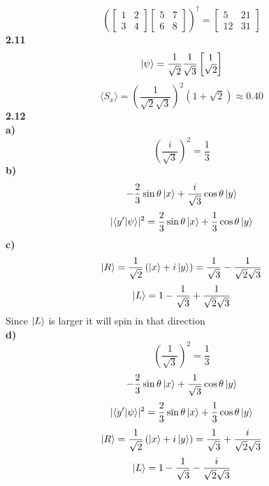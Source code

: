 \documentclass[english]{article}
\begin{document}
\begin{multicols*}{2}
\[
\left(
\begin{bmatrix}
1&2\\
3&4
\end{bmatrix}
\begin{bmatrix}
5&7\\
6&8
\end{bmatrix}
\right)^\dag
=
\begin{bmatrix}
5&21\\
12&31
\end{bmatrix}
\]
\noindent
\textbf{2.11}\\
\[
\ket{\psi}=\frac{1}{\sqrt{2}}\frac{1}{\sqrt{3}}
\begin{bmatrix}
1\\
\sqrt{2}
\end{bmatrix}
\]
$$\langle S_x\rangle=\left(\frac{1}{\sqrt{2}\sqrt{3}}\right)^2\left(1+\sqrt{2}\right)\approx0.40$$
\noindent
\textbf{2.12}\\
\textbf{a)} $$\left(\frac{i}{\sqrt{3}}\right)^2=\frac{1}{3}$$
\textbf{b)} $$-\frac{2}{3}\sin\theta\ket{x}+\frac{i}{\sqrt{3}}\cos\theta\ket{y}$$
$$\lvert\bra{y'}\ket{\psi}\rvert^2=\frac{2}{3}\sin\theta\ket{x}+\frac{1}{3}\cos\theta\ket{y}$$
\textbf{c)} $$\ket{R}=\frac{1}{\sqrt{2}}\left(\ket{x}+i\ket{y}\right)=\frac{1}{\sqrt{3}}-\frac{1}{\sqrt{2}\sqrt{3}}$$
$$\ket{L}=1-\frac{1}{\sqrt{3}}+\frac{1}{\sqrt{2}\sqrt{3}}$$
Since $\ket{L}$ is larger it will spin in that direction\\
\textbf{d)} $$\left(\frac{1}{\sqrt{3}}\right)^2=\frac{1}{3}$$
$$-\frac{2}{3}\sin\theta\ket{x}+\frac{1}{\sqrt{3}}\cos\theta\ket{y}$$
$$\lvert\bra{y'}\ket{\psi}\rvert^2=\frac{2}{3}\sin\theta\ket{x}+\frac{1}{3}\cos\theta\ket{y}$$
$$\ket{R}=\frac{1}{\sqrt{2}}\left(\ket{x}+i\ket{y}\right)=\frac{1}{\sqrt{3}}+\frac{i}{\sqrt{2}\sqrt{3}}$$
$$\ket{L}=1-\frac{1}{\sqrt{3}}-\frac{i}{\sqrt{2}\sqrt{3}}$$
\end{multicols*}
\end{document}
